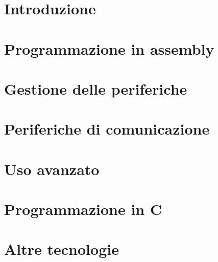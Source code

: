 \documentclass{report}
\begin{document}


\chapter{Introduzione}




\chapter{Programmazione in assembly}













\chapter{Gestione delle periferiche}







\chapter{Periferiche di comunicazione}





\chapter{Uso avanzato}





\chapter{Programmazione in C}



\chapter{Altre tecnologie}


\end{document}

